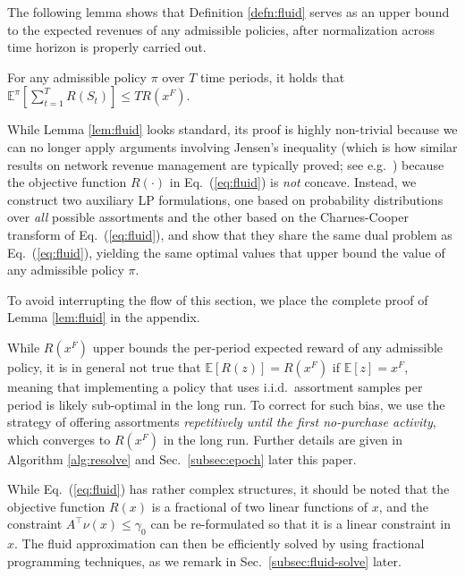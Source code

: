 \documentclass[opre]{informs3aa}
\begin{document}
{
The following lemma shows that Definition \ref{defn:fluid} serves as an upper bound to the expected revenues of any admissible policies,
after normalization across time horizon is properly carried out.
\begin{lemma}
For any admissible policy $\pi$ over $T$ time periods, it holds that $\mathbb E^\pi[\sum_{t=1}^T R(S_t)] \leq T R(x^F)$.
\label{lem:fluid}
\end{lemma}
While Lemma \ref{lem:fluid} looks standard, its proof is highly non-trivial because we can no longer apply arguments involving Jensen's inequality
(which is how similar results on network revenue management are typically proved; see e.g.~\citep{jasin2014reoptimization,Wang2020constant})
because the objective function $R(\cdot)$ in Eq.~(\ref{eq:fluid}) is \emph{not} concave.
Instead, we construct two auxiliary LP formulations, one based on probability distributions over \emph{all} possible assortments and the other 
based on the Charnes-Cooper transform of Eq.~(\ref{eq:fluid}), and show that they share the same dual problem as Eq.~(\ref{eq:fluid}),
yielding the same optimal values that upper bound the value of any admissible policy $\pi$.

To avoid interrupting the flow of this section, we place the complete proof of Lemma \ref{lem:fluid} in the appendix.
}

\begin{remark}
While $R(x^F)$ upper bounds the per-period expected reward of any admissible policy, it is in general not true that $\mathbb E[R(z)]=R(x^F)$ if $\mathbb E[z]=x^F$,
meaning that implementing a policy that uses i.i.d.~assortment samples per period is likely sub-optimal in the long run.
To correct for such bias, we use the strategy of offering assortments \emph{repetitively until the first no-purchase activity}, which converges to $R(x^F)$ in the long run.
Further details are given in Algorithm \ref{alg:resolve} and Sec.~\ref{subsec:epoch} later this paper.
\end{remark}

While Eq.~(\ref{eq:fluid}) has rather complex structures, it should be noted that the objective function $R(x)$ is a fractional of two linear functions of $x$, and the constraint $A^\top\nu(x)\leq\gamma_0$
can be re-formulated so that it is a linear constraint in $x$. The fluid approximation can then be efficiently solved by using fractional programming techniques, as we remark in Sec.~\ref{subsec:fluid-solve} later.

\end{document}
